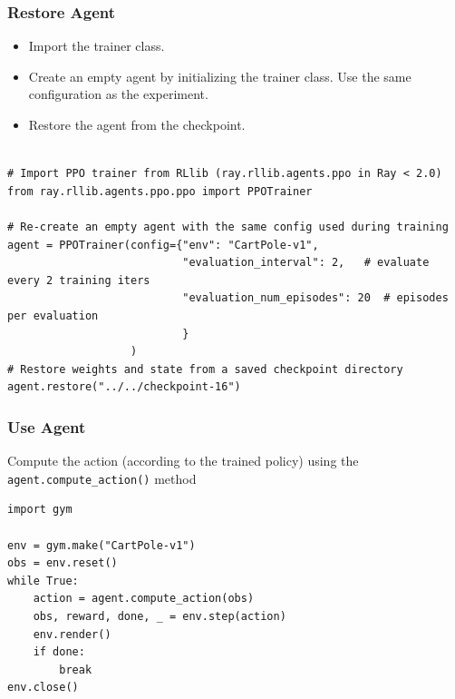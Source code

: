 \begin{frame}[fragile]\frametitle{Restore Agent}

\begin{itemize}
\item Import the trainer class.
\item Create an empty agent by initializing the trainer class. Use the same configuration as the experiment.
\item Restore the agent from the checkpoint.
\end{itemize}



\begin{lstlisting}

# Import PPO trainer from RLlib (ray.rllib.agents.ppo in Ray < 2.0)
from ray.rllib.agents.ppo.ppo import PPOTrainer

# Re-create an empty agent with the same config used during training
agent = PPOTrainer(config={"env": "CartPole-v1",
                           "evaluation_interval": 2,   # evaluate every 2 training iters
                           "evaluation_num_episodes": 20  # episodes per evaluation
                           }
                   )
# Restore weights and state from a saved checkpoint directory
agent.restore("../../checkpoint-16")
\end{lstlisting}

\end{frame}

\begin{frame}[fragile]\frametitle{Use Agent}

Compute the action (according to the trained policy) using the \lstinline|agent.compute_action()| method

\begin{lstlisting}
import gym

env = gym.make("CartPole-v1")
obs = env.reset()
while True:
    action = agent.compute_action(obs)
    obs, reward, done, _ = env.step(action)
    env.render()
    if done:
        break
env.close()
\end{lstlisting}

\end{frame}


